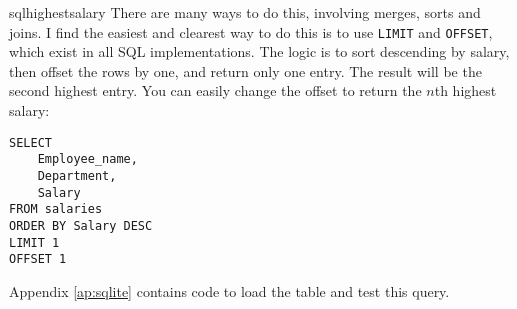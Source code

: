 \begin{subanswer}{sqlhighestsalary}
There are many ways to do this, involving merges, sorts and joins.
I find the easiest and clearest way to do this is to use \verb+LIMIT+ and \verb+OFFSET+, which exist in all SQL implementations.
The logic is to sort descending by salary, then offset the rows by one, and return only one entry.
The result will be the second highest entry.
You can easily change the offset to return the $n$th highest salary:
\begin{verbatim}
SELECT
    Employee_name,
    Department,
    Salary
FROM salaries
ORDER BY Salary DESC
LIMIT 1
OFFSET 1
\end{verbatim}
Appendix \ref{ap:sqlite} contains code to load the table and test this query.
\end{subanswer}
